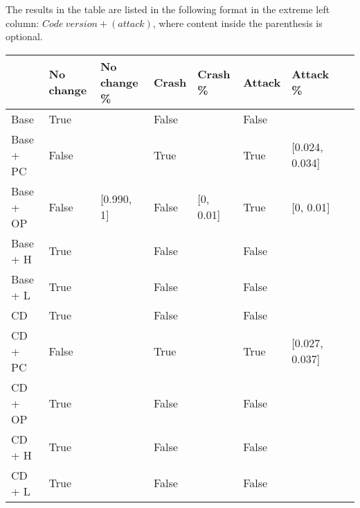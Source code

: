 The results in the table are listed in the following format in the extreme left column: $Code\:version + (attack)$, where content inside the parenthesis is optional.

\begin{table}[H]
    \begin{tabular}{l|l|l|l|l|l|l|l}
    ~         & No change & No change \% & Crash & Crash \% & Attack & Attack \% \\ \hline
    Base      & True &\relax[0.990, 1] & False & \relax[0, 0.01] & False & \relax[0, 0.01] ~                                                                                    & ~ \\
    Base + PC & False & \relax[0.854, 0.864] & True & \relax[0.108, 0.118] & True & [0.024, 0.034]                                                                                   & ~ \\
    Base + OP & False & [0.990, 1] & False & [0, 0.01] & True & [0, 0.01]                                                                                   & ~ \\
    Base + H  & True &\relax[0.990, 1] & False & \relax[0, 0.01] & False & \relax[0, 0.01]                                                                                    & ~ \\
    Base + L  & True &\relax[0.990, 1] & False & \relax[0, 0.01] & False & \relax[0, 0.01]                                                                                    & ~ \\
    CD        & True &\relax[0.990, 1] & False & \relax[0, 0.01] & False & \relax[0, 0.01]                                                                                    & ~ \\
    CD + PC   & False & \relax[0.851, 0.861] & True & \relax[0.108, 0.118] & True & [0.027, 0.037]                                                                                & ~ \\
    CD + OP   & True &\relax[0.990, 1] & False & \relax[0, 0.01] & False & \relax[0, 0.01]                                                                                   & ~ \\
    CD + H    & True &\relax[0.990, 1] & False & \relax[0, 0.01] & False & \relax[0, 0.01]                                                                                    & ~ \\
    CD + L    & True &\relax[0.990, 1] & False & \relax[0, 0.01] & False & \relax[0, 0.01]                                                                                    & ~ \\

\end{tabular}
\end{table}
